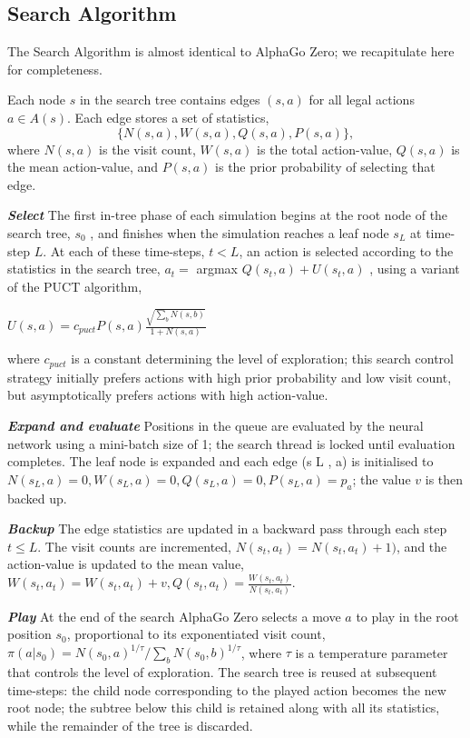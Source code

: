 \documentclass[12pt,a4paper]{article}
\begin{document}
\subsection{Search Algorithm}
\hspace{0.6cm}The Search Algorithm is almost identical to AlphaGo Zero\cite{AlphaGoZero}; we recapitulate here for completeness.\par 
Each node \(s\) in the search tree contains edges \((s, a)\) for all legal actions \(a \in A(s)\). Each edge stores a set of statistics, \[\{N(s, a), W(s, a), Q(s, a), P(s, a)\},\] where \(N(s, a)\) is the visit count, \(W(s, a)\) is the total action-value, \(Q(s, a)\) is the mean action-value, and \(P(s, a)\) is the prior probability of selecting that edge. \par
\hspace{0.6cm}\textit{\textbf{Select}} The first in-tree phase of each simulation begins at the root node of the search tree, \(s_0\) , and finishes when the simulation reaches a leaf node \(s_L\) at time-step \(L\). At each of these time-steps, \(t < L\), an action is selected according to the statistics in the search tree, \(a_t =\) argmax \(Q(s_t, a) + U (s_t , a)\) , using a variant of the PUCT algorithm, 
\begin{center}\(U(s,a) = c_{puct}P(s,a)\frac{\sqrt{\sum_b N(s,b)}}{1+N(s,a)} \)\end{center}\par
where \(c_{puct}\) is a constant determining the level of exploration; this search control strategy initially prefers actions with high prior probability and low visit count, but asymptotically prefers actions with high action-value.\par
\textit{\textbf{Expand and evaluate}} Positions in the queue are evaluated by the neural network using a mini-batch size of 1; the search thread is locked until evaluation completes. The leaf node is expanded and each edge (s L , a) is initialised to \({N(s_L, a) = 0, W(s_L , a) = 0, Q(s_L , a) = 0, P (s_L , a) = p_a }\); the value \(v\) is then backed up.\par
\textit{\textbf{Backup}} The edge statistics are updated in a backward pass through each step \(t \leq L\). The visit counts are incremented, \(N(s_t , a_t ) = N(s_t , a_t ) + 1)\), and the action-value is updated to the mean value, \(W(s_t , a_t ) = W(s_t , a_t) + v, Q(s_t , a_t) =\frac{W(s_t ,a_t)}{N(s_t ,a_t)}\).\par
\textit{\textbf{Play}} At the end of the search AlphaGo Zero selects a move \(a\) to play in the root position \(s_0\), proportional to its exponentiated visit count, \(\pi(a|s_0 ) = N(s_0,a)^{1/\tau} /\sum_b N (s_0 , b)^{1/\tau}\), where \(\tau\) is a temperature parameter that controls the level of exploration. The search tree is reused at subsequent time-steps: the child node corresponding to the played action becomes the new root node; the subtree below this child is retained along with all its statistics, while the remainder of the tree is discarded.
\end{document}
